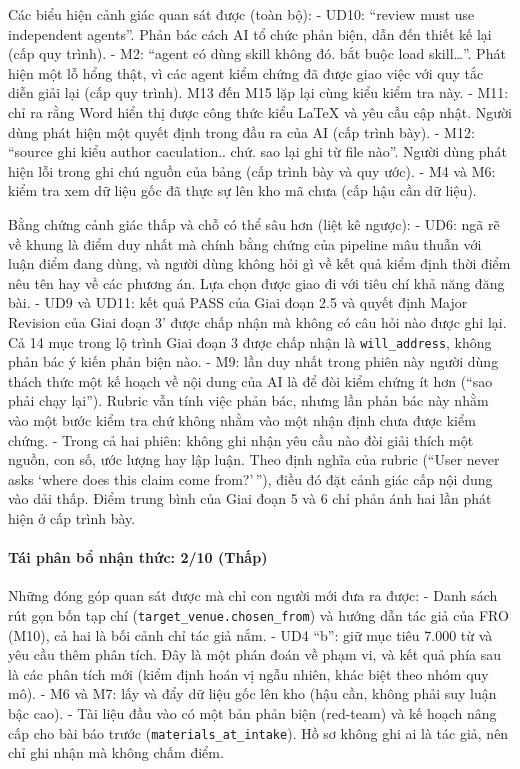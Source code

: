 \documentclass[12pt,a4paper]{article}
\begin{document}
Các biểu hiện cảnh giác quan sát được (toàn bộ): - UD10: ``review must
use independent agents''. Phản bác cách AI tổ chức phản biện, dẫn đến
thiết kế lại (cấp quy trình). - M2: ``agent có dùng skill không đó. bắt
buộc load skill\ldots{}''. Phát hiện một lỗ hổng thật, vì các agent kiểm
chứng đã được giao việc với quy tắc diễn giải lại (cấp quy trình). M13
đến M15 lặp lại cùng kiểu kiểm tra này. - M11: chỉ ra rằng Word hiển thị
được công thức kiểu LaTeX và yêu cầu cập nhật. Người dùng phát hiện một
quyết định trong đầu ra của AI (cấp trình bày). - M12: ``source ghi kiểu
author caculation.. chứ. sao lại ghi từ file nào''. Người dùng phát hiện
lỗi trong ghi chú nguồn của bảng (cấp trình bày và quy ước). - M4 và M6:
kiểm tra xem dữ liệu gốc đã thực sự lên kho mã chưa (cấp hậu cần dữ
liệu).

Bằng chứng cảnh giác thấp và chỗ có thể sâu hơn (liệt kê ngược): - UD6:
ngã rẽ về khung là điểm duy nhất mà chính bằng chứng của pipeline mâu
thuẫn với luận điểm đang dùng, và người dùng không hỏi gì về kết quả
kiểm định thời điểm nêu tên hay về các phương án. Lựa chọn được giao đi
với tiêu chí khả năng đăng bài. - UD9 và UD11: kết quả PASS của Giai
đoạn 2.5 và quyết định Major Revision của Giai đoạn 3' được chấp nhận mà
không có câu hỏi nào được ghi lại. Cả 14 mục trong lộ trình Giai đoạn 3
được chấp nhận là \texttt{will\_address}, không phản bác ý kiến phản
biện nào. - M9: lần duy nhất trong phiên này người dùng thách thức một
kế hoạch về nội dung của AI là để đòi kiểm chứng ít hơn (``sao phải chạy
lại''). Rubric vẫn tính việc phản bác, nhưng lần phản bác này nhằm vào
một bước kiểm tra chứ không nhằm vào một nhận định chưa được kiểm chứng.
- Trong cả hai phiên: không ghi nhận yêu cầu nào đòi giải thích một
nguồn, con số, ước lượng hay lập luận. Theo định nghĩa của rubric
(``User never asks `where does this claim come from?'\,''), điều đó đặt
cảnh giác cấp nội dung vào dải thấp. Điểm trung bình của Giai đoạn 5 và
6 chỉ phản ánh hai lần phát hiện ở cấp trình bày.

\hypertarget{tuxe1i-phuxe2n-bux1ed5-nhux1eadn-thux1ee9c-210-thux1ea5p}{%
\paragraph{Tái phân bổ nhận thức: 2/10
(Thấp)}\label{tuxe1i-phuxe2n-bux1ed5-nhux1eadn-thux1ee9c-210-thux1ea5p}}

Những đóng góp quan sát được mà chỉ con người mới đưa ra được: - Danh
sách rút gọn bốn tạp chí (\texttt{target\_venue.chosen\_from}) và hướng
dẫn tác giả của FRO (M10), cả hai là bối cảnh chỉ tác giả nắm. - UD4
``b'': giữ mục tiêu 7.000 từ và yêu cầu thêm phân tích. Đây là một phán
đoán về phạm vi, và kết quả phía sau là các phân tích mới (kiểm định
hoán vị ngẫu nhiên, khác biệt theo nhóm quy mô). - M6 và M7: lấy và đẩy
dữ liệu gốc lên kho (hậu cần, không phải suy luận bậc cao). - Tài liệu
đầu vào có một bản phản biện (red-team) và kế hoạch nâng cấp cho bài báo
trước (\texttt{materials\_at\_intake}). Hồ sơ không ghi ai là tác giả,
nên chỉ ghi nhận mà không chấm điểm.
\end{document}
